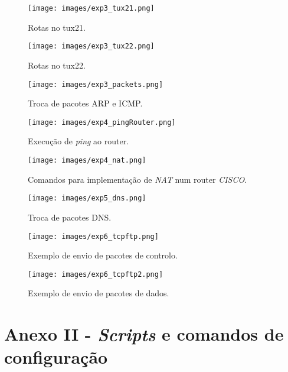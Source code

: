 \documentclass[a4paper, 11pt]{article}
\begin{document}
\hfill

\begin{figure}[H]
\centering
\texttt{[image: images/exp3\_tux21.png]}
\caption{Rotas no tux21.}
\end{figure}

\hfill

\begin{figure}[H]
\centering
\texttt{[image: images/exp3\_tux22.png]}
\caption{Rotas no tux22.}
\end{figure}

\hfill

\begin{figure}[H]
\centering
\texttt{[image: images/exp3\_packets.png]}
\caption{Troca de pacotes ARP e ICMP.}
\end{figure}

\hfill

\begin{figure}[H]
\centering
\texttt{[image: images/exp4\_pingRouter.png]}
\caption{Execução de \textit{ping} ao router.}
\end{figure}

\hfill

\begin{figure}[H]
\centering
\texttt{[image: images/exp4\_nat.png]}
\caption{Comandos para implementação de \textit{NAT} num router \textit{CISCO}.}
\end{figure}

\hfill

\begin{figure}[H]
\centering
\texttt{[image: images/exp5\_dns.png]}
\caption{Troca de pacotes DNS.}
\end{figure}

\hfill

\begin{figure}[H]
\centering
\texttt{[image: images/exp6\_tcpftp.png]}
\caption{Exemplo de envio de pacotes de controlo.}
\end{figure}

\hfill

\begin{figure}[H]
\centering
\texttt{[image: images/exp6\_tcpftp2.png]}
\caption{Exemplo de envio de pacotes de dados.}
\end{figure}

\clearpage

\newpage
\section{Anexo II - \textit{Scripts} e comandos de configuração}
\end{document}

